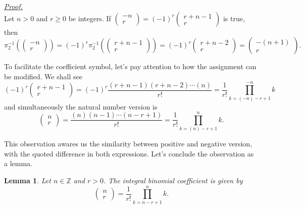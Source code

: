 \documentclass[12pt]{article}
\newtheorem*{lemma}{Lemma}
\renewenvironment{proof}[1][Proof]{\begin{snugshade*} \underline{\textit{{#1}.}}\\}{\hfill \qedsymbol \end{snugshade*}}
\begin{document}
    \begin{proof}
        Let $n>0$ and $r\geq 0$ be integers. If $\begin{pmatrix}
            -n\\r
        \end{pmatrix}=(-1)^r\begin{pmatrix}
            r+n-1\\r
        \end{pmatrix}$ is true, then \[\pi_2^{-1}(\begin{pmatrix}
            -n\\r
        \end{pmatrix})=(-1)^r \pi_2^{-1}(\begin{pmatrix}
            r+n-1\\r
        \end{pmatrix})=(-1)^r \begin{pmatrix}
            r+n-2\\r
        \end{pmatrix}=\begin{pmatrix}
            -(n+1)\\r
        \end{pmatrix}.\]
    \end{proof}

    To facilitate the coefficient symbol, let's pay attention to how the assignment can be modified. We shall see \[(-1)^r\begin{pmatrix}
        r+n-1\\r
    \end{pmatrix}=(-1)^r\frac{(r+n-1)(r+n-2)\cdots(n)}{r!}=\frac{1}{r!}\prod_{k=(-n)-r+1}^{-n}k\] and simultaneously the natural number version is \[\begin{pmatrix}
        n\\r
    \end{pmatrix}=\frac{(n)(n-1)\cdots(n-r+1)}{r!}=\frac{1}{r!}\prod_{k=(n)-r+1}^{n}k.\]

    This observation awares us the similarity between positive and negative version, with the quoted difference in both expressions. Let's conclude the observation as a lemma.

    \begin{lemma}
        Let $n\in\mathbb{Z}$ and $r>0$. The integral binomial coefficient is given by \[\begin{pmatrix}
            n\\r
        \end{pmatrix}=\frac{1}{r!}\prod_{k=n-r+1}^{n}k.\]
    \end{lemma}
\end{document}
